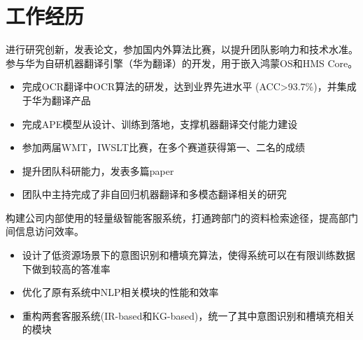 \documentclass{resume}
\begin{document}


 

\section{工作经历}
进行研究创新，发表论文，参加国内外算法比赛，以提升团队影响力和技术水准。参与华为自研机器翻译引擎（华为翻译）的开发，用于嵌入鸿蒙OS和HMS Core。
\begin{itemize}
  \item 完成OCR翻译中OCR算法的研发，达到业界先进水平 (ACC>93.7\%)，并集成于华为翻译产品
  \item 完成APE模型从设计、训练到落地，支撑机器翻译交付能力建设
  \item 参加两届WMT，IWSLT比赛，在多个赛道获得第一、二名的成绩
  \item 提升团队科研能力，发表多篇paper
  \item 团队中主持完成了非自回归机器翻译和多模态翻译相关的研究
\end{itemize}

构建公司内部使用的轻量级智能客服系统，打通跨部门的资料检索途径，提高部门间信息访问效率。
\begin{itemize}
  \item 设计了低资源场景下的意图识别和槽填充算法，使得系统可以在有限训练数据下做到较高的答准率
  \item 优化了原有系统中NLP相关模块的性能和效率
  \item 重构两套客服系统(IR-based和KG-based)，统一了其中意图识别和槽填充相关的模块
\end{itemize}
\end{document}
